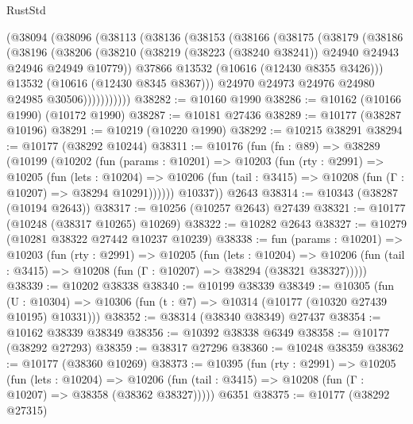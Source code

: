 \begin{lexlean}{RustStd}
\begin{coremodule}
        (@38094
          (@38096
            (@38113
              (@38136
                (@38153
                  (@38166
                    (@38175
                      (@38179
                        (@38186
                          (@38196
                            (@38206
                              (@38210
                                (@38219
                                  (@38223 (@38240 @38241))
                                  @24940
                                  @24943
                                  @24946
                                  @24949
                                  @10779))
                              @37866
                              @13532
                              (@10616 (@12430 @8355 @3426)))
                            @13532
                            (@10616 (@12430 @8345 @8367)))
                          @24970
                          @24973
                          @24976
                          @24980
                          @24985
                          @30506)))))))))))
@38282 := @10160 @1990
@38286 := @10162 (@10166 @1990) (@10172 @1990)
@38287 := @10181 @27436
@38289 := @10177 (@38287 @10196)
@38291 := @10219 (@10220 @1990)
@38292 := @10215 @38291
@38294 := @10177 (@38292 @10244)
@38311 := @10176
    (fun (fn : @89) =>
    @38289
      (@10199
        (@10202
          (fun (params : @10201) =>
          @10203
            (fun (rty : @2991) =>
            @10205
              (fun (lets : @10204) =>
              @10206 (fun (tail : @3415) => @10208 (fun (Γ : @10207) => @38294 @10291))))))
        @10337))
    @2643
@38314 := @10343 (@38287 (@10194 @2643))
@38317 := @10256 (@10257 @2643) @27439
@38321 := @10177 (@10248 (@38317 @10265) @10269)
@38322 := @10282 @2643
@38327 := @10279 (@10281 @38322 @27442 @10237 @10239)
@38338 := fun (params : @10201) =>
  @10203
    (fun (rty : @2991) =>
    @10205
      (fun (lets : @10204) =>
      @10206 (fun (tail : @3415) => @10208 (fun (Γ : @10207) => @38294 (@38321 @38327)))))
@38339 := @10202 @38338
@38340 := @10199 @38339
@38349 := @10305
    (fun (U : @10304) => @10306 (fun (t : @7) => @10314 (@10177 (@10320 @27439 @10195) @10331)))
@38352 := @38314 (@38340 @38349) @27437
@38354 := @10162 @38339 @38349
@38356 := @10392 @38338 @6349
@38358 := @10177 (@38292 @27293)
@38359 := @38317 @27296
@38360 := @10248 @38359
@38362 := @10177 (@38360 @10269)
@38373 := @10395
    (fun (rty : @2991) =>
    @10205
      (fun (lets : @10204) =>
      @10206 (fun (tail : @3415) => @10208 (fun (Γ : @10207) => @38358 (@38362 @38327)))))
    @6351
@38375 := @10177 (@38292 @27315)

\end{coremodule}
\end{lexlean}
